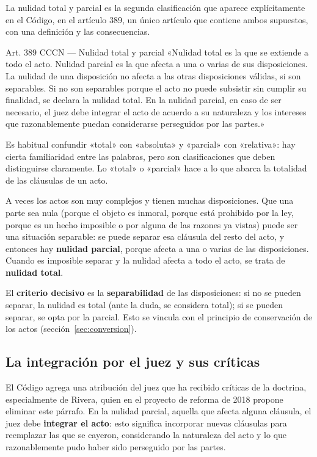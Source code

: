 \documentclass[12pt,oneside]{book}
\begin{document}
La nulidad total y parcial es la segunda clasificación que aparece explícitamente en el Código, en el artículo 389, un único artículo que contiene ambos supuestos, con una definición y las consecuencias.

\begin{articulo}{Art. 389 CCCN --- Nulidad total y parcial}
«Nulidad total es la que se extiende a todo el acto. Nulidad parcial es la que afecta a una o varias de sus disposiciones. La nulidad de una disposición no afecta a las otras disposiciones válidas, si son separables. Si no son separables porque el acto no puede subsistir sin cumplir su finalidad, se declara la nulidad total. En la nulidad parcial, en caso de ser necesario, el juez debe integrar el acto de acuerdo a su naturaleza y los intereses que razonablemente puedan considerarse perseguidos por las partes.»
\end{articulo}

\begin{important}
Es habitual confundir «total» con «absoluta» y «parcial» con «relativa»: hay cierta familiaridad entre las palabras, pero son clasificaciones que deben distinguirse claramente. Lo «total» o «parcial» hace a lo que abarca la totalidad de las cláusulas de un acto.
\end{important}

A veces los actos son muy complejos y tienen muchas disposiciones. Que una parte sea nula (porque el objeto es inmoral, porque está prohibido por la ley, porque es un hecho imposible o por alguna de las razones ya vistas) puede ser una situación separable: se puede separar esa cláusula del resto del acto, y entonces hay \textbf{nulidad parcial}, porque afecta a una o varias de las disposiciones. Cuando es imposible separar y la nulidad afecta a todo el acto, se trata de \textbf{nulidad total}.

El \textbf{criterio decisivo} es la \textbf{separabilidad} de las disposiciones: si no se pueden separar, la nulidad es total (ante la duda, se considera total); si se pueden separar, se opta por la parcial. Esto se vincula con el principio de conservación de los actos (sección~\ref{sec:conversion}).

\subsection*{La integración por el juez y sus críticas}

El Código agrega una atribución del juez que ha recibido críticas de la doctrina, especialmente de Rivera, quien en el proyecto de reforma de 2018 propone eliminar este párrafo. En la nulidad parcial, aquella que afecta alguna cláusula, el juez debe \textbf{integrar el acto}: esto significa incorporar nuevas cláusulas para reemplazar las que se cayeron, considerando la naturaleza del acto y lo que razonablemente pudo haber sido perseguido por las partes.
\end{document}
